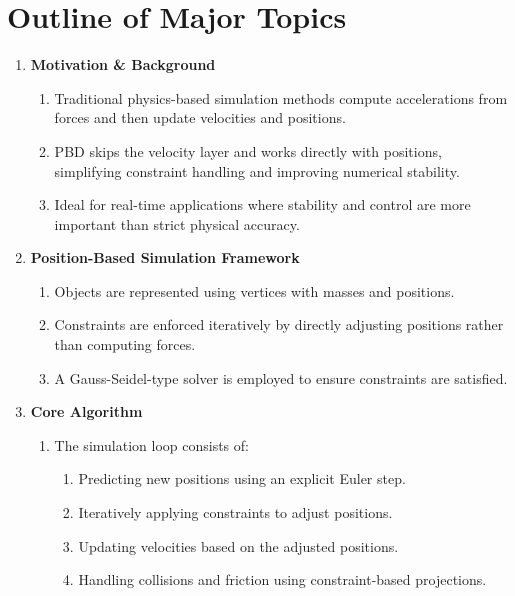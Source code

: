 \documentclass[12pt]{article}
\begin{document}
\section{Outline of Major Topics}
\begin{enumerate}[noitemsep]
    \item \textbf{Motivation \& Background}
    \begin{enumerate}[noitemsep]
        \item Traditional physics-based simulation methods compute accelerations from forces and then update velocities and positions.
        \item PBD skips the velocity layer and works directly with positions, simplifying constraint handling and improving numerical stability.
        \item Ideal for real-time applications where stability and control are more important than strict physical accuracy.
    \end{enumerate}
    
    \item \textbf{Position-Based Simulation Framework}
    \begin{enumerate}[noitemsep]
        \item Objects are represented using vertices with masses and positions.
        \item Constraints are enforced iteratively by directly adjusting positions rather than computing forces.
        \item A Gauss-Seidel-type solver is employed to ensure constraints are satisfied.
    \end{enumerate}
    
    \item \textbf{Core Algorithm}
    \begin{enumerate}[noitemsep]
        \item The simulation loop consists of:
            \begin{enumerate}[noitemsep]
                \item Predicting new positions using an explicit Euler step.
                \item Iteratively applying constraints to adjust positions.
                \item Updating velocities based on the adjusted positions.
                \item Handling collisions and friction using constraint-based projections.
            \end{enumerate}
    \end{enumerate}
    

\end{enumerate}
\end{document}
